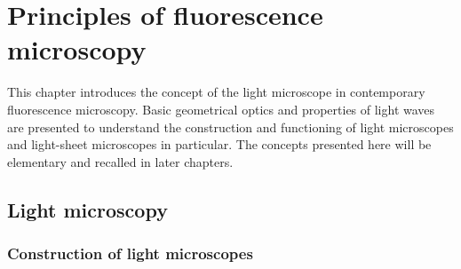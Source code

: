 
\ifpdf
    \graphicspath{{Chapters/principles/Figs/Raster/}{Chapters/principles/Figs/PDF/}{Chapters/principles/Figs/}}
\else
    \graphicspath{{Chapters/principles/Figs/Vector/}{Chapters/principles/Figs/}}
\fi

\chapter{Principles of fluorescence microscopy}\label{chapter:principles}

This chapter introduces the concept of the light microscope in contemporary fluorescence microscopy.
Basic geometrical optics and properties of light waves are presented to understand the construction and functioning of light microscopes and light-sheet microscopes in particular.
The concepts presented here will be elementary and recalled in later chapters.

%

\pagebreak
\section{Light microscopy}

\subsection{Construction of light microscopes}

